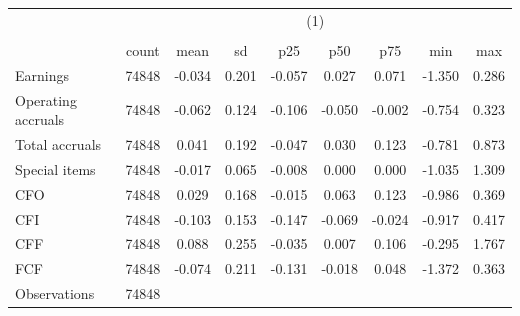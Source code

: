 {
\def\sym#1{\ifmmode^{#1}\else\(^{#1}\)\fi}
\begin{tabular}{l*{1}{cccccccc}}
\hline\hline
                    &\multicolumn{8}{c}{(1)}                                                                                \\
                    &\multicolumn{8}{c}{}                                                                                   \\
                    &       count&        mean&          sd&         p25&         p50&         p75&         min&         max\\
\hline
Earnings            &       74848&      -0.034&       0.201&      -0.057&       0.027&       0.071&      -1.350&       0.286\\
Operating accruals  &       74848&      -0.062&       0.124&      -0.106&      -0.050&      -0.002&      -0.754&       0.323\\
Total accruals      &       74848&       0.041&       0.192&      -0.047&       0.030&       0.123&      -0.781&       0.873\\
Special items       &       74848&      -0.017&       0.065&      -0.008&       0.000&       0.000&      -1.035&       1.309\\
CFO                 &       74848&       0.029&       0.168&      -0.015&       0.063&       0.123&      -0.986&       0.369\\
CFI                 &       74848&      -0.103&       0.153&      -0.147&      -0.069&      -0.024&      -0.917&       0.417\\
CFF                 &       74848&       0.088&       0.255&      -0.035&       0.007&       0.106&      -0.295&       1.767\\
FCF                 &       74848&      -0.074&       0.211&      -0.131&      -0.018&       0.048&      -1.372&       0.363\\
\hline
Observations        &       74848&            &            &            &            &            &            &            \\
\hline\hline
\end{tabular}
}
